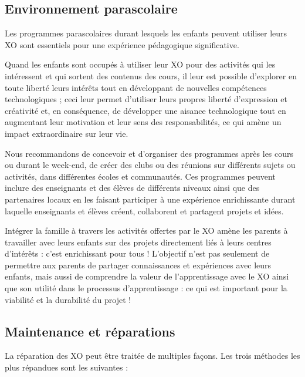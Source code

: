 \documentclass[11pt]{article}
\begin{document}
\subsection{Environnement parascolaire}
\label{sec-10-2}



Les programmes parascolaires durant lesquels les enfants peuvent utiliser
leurs XO sont essentiels pour une expérience pédagogique significative.

Quand les enfants sont occupés à utiliser leur XO pour des activités qui
les intéressent et qui sortent des contenus des cours, il leur est possible
d'explorer en toute liberté leurs intérêts tout en développant de nouvelles
compétences technologiques ; ceci leur permet d'utiliser leurs propres
liberté d'expression et créativité et, en conséquence, de développer une
aisance technologique tout en augmentant leur motivation et leur sens des
responsabilités, ce qui amène un impact extraordinaire sur leur vie.

Nous recommandons de concevoir et d'organiser des programmes après les
cours ou durant le week-end, de créer des clubs ou des réunions sur
différents sujets ou activités, dans différentes écoles et communautés. Ces
programmes peuvent inclure des enseignants et des élèves de différents
niveaux ainsi que des partenaires locaux en les faisant participer à une
expérience enrichissante durant laquelle enseignants et élèves créent,
collaborent et partagent projets et idées.

Intégrer la famille à travers les activités offertes par le XO amène les
parents à travailler avec leurs enfants sur des projets directement liés à
leurs centres d'intérêts : c'est enrichissant pour tous ! L'objectif n'est
pas seulement de permettre aux parents de partager connaissances et
expériences avec leurs enfants, mais aussi de comprendre la valeur de
l'apprentissage avec le XO ainsi que son utilité dans le processus
d'apprentissage : ce qui est important pour la viabilité et la durabilité
du projet !
\subsection{Maintenance et réparations}
\label{sec-10-3}



La réparation des XO peut être traitée de multiples façons. Les trois
méthodes les plus répandues sont les suivantes :
\end{document}
